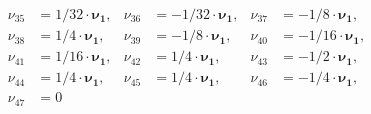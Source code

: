 \documentclass[a4paper,12pt, DIV=14, BCOR=5mm, twoside, headsepline]{scrbook}
\begin{document}
\begin{align}
\begin{alignedat}{3}
%
\nu_{{35}} &= 1/32\cdot \boldsymbol{\nu_1} ,  & \nu_{{36}}   &= -1/32\cdot \boldsymbol{\nu_1} ,   & \nu_{{37}}    &= -1/8\cdot \boldsymbol{\nu_1} , \\
%
\nu_{{38}} &= 1/4\cdot \boldsymbol{\nu_1} ,  & \nu_{{39}}   &= -1/8\cdot \boldsymbol{\nu_1} ,   & \nu_{{40}}    &= -1/16\cdot \boldsymbol{\nu_1} , \\
%
\nu_{{41}} &= 1/16\cdot \boldsymbol{\nu_1} ,  & \nu_{{42}}   &= 1/4\cdot \boldsymbol{\nu_1} ,   & \nu_{{43}}    &= -1/2\cdot \boldsymbol{\nu_1} , \\
%
\nu_{{44}} &= 1/4\cdot \boldsymbol{\nu_1} ,  & \nu_{{45}}   &= 1/4\cdot \boldsymbol{\nu_1} ,   & \nu_{{46}}    &= -1/4\cdot \boldsymbol{\nu_1} , \\
%
\nu_{{47}} &= 0  &   &   &    & 
\end{alignedat}
\end{align}
\end{document}
